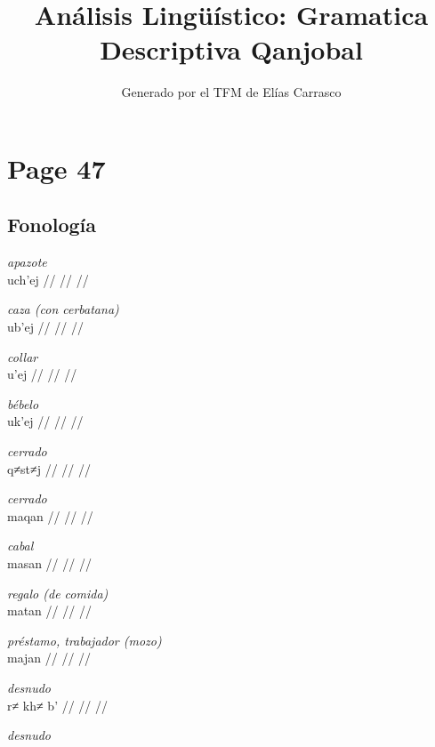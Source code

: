 \documentclass{article}%
\title{Análisis Lingüístico: Gramatica Descriptiva Qanjobal}%
\author{Generado por el TFM de Elías Carrasco}%
\begin{document}
%
\normalsize%
\maketitle%
\section{Page 47}%
\label{sec:Page47}%
\subsection{Fonología}%
\label{subsec:Fonologa}%

%
\par\medskip%
\ex
\textit{apazote} \\
\begingl
\gla uch'ej //
\glb  //
\glc  //
\endgl
\xe
%
\medskip%
\par\medskip%
\ex
\textit{caza (con cerbatana)} \\
\begingl
\gla ub'ej //
\glb  //
\glc  //
\endgl
\xe
%
\medskip%
\par\medskip%
\ex
\textit{collar} \\
\begingl
\gla u'ej //
\glb  //
\glc  //
\endgl
\xe
%
\medskip%
\par\medskip%
\ex
\textit{bébelo} \\
\begingl
\gla uk'ej //
\glb  //
\glc  //
\endgl
\xe
%
\medskip%
\par\medskip%
\ex
\textit{cerrado} \\
\begingl
\gla q≠st≠j //
\glb  //
\glc  //
\endgl
\xe
%
\medskip%
\par\medskip%
\ex
\textit{cerrado} \\
\begingl
\gla maqan //
\glb  //
\glc  //
\endgl
\xe
%
\medskip%
\par\medskip%
\ex
\textit{cabal} \\
\begingl
\gla masan //
\glb  //
\glc  //
\endgl
\xe
%
\medskip%
\par\medskip%
\ex
\textit{regalo (de comida)} \\
\begingl
\gla matan //
\glb  //
\glc  //
\endgl
\xe
%
\medskip%
\par\medskip%
\ex
\textit{préstamo, trabajador (mozo)} \\
\begingl
\gla majan //
\glb  //
\glc  //
\endgl
\xe
%
\medskip%
\par\medskip%
\ex
\textit{desnudo} \\
\begingl
\gla r≠ kh≠ b' //
\glb  //
\glc  //
\endgl
\xe
%
\medskip%
\par\medskip%
\ex
\textit{desnudo} \\
\end{document}
